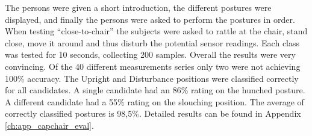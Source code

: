 The persons were given a short introduction, the different postures were displayed, and finally the persons were asked to perform the postures in order. When testing “close-to-chair” the subjects were asked to rattle at the chair, stand close, move it around and thus disturb the potential sensor readings. Each class was tested for 10 seconds, collecting 200 samples. Overall the results were very convincing. Of the 40 different measurements series only two were not achieving 100\% accuracy. The Upright and Disturbance positions were classified correctly for all candidates. A single candidate had an 86\% rating on the hunched posture. A different candidate had a 55\% rating on the slouching position. The average of correctly classified postures is 98,5\%. Detailed results can be found in Appendix \ref{ch:app_capchair_eval}.


